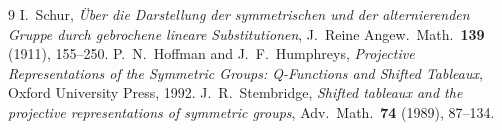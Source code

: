 \documentclass[11pt]{article}
\theoremstyle{remark}
\begin{document}
\begin{thebibliography}{9}
 I.~Schur, \emph{\"Uber die Darstellung der symmetrischen und der alternierenden
Gruppe durch gebrochene lineare Substitutionen}, J.~Reine Angew.\ Math.\ \textbf{139} (1911),
155--250.
 P.~N.~Hoffman and J.~F.~Humphreys, \emph{Projective Representations of the Symmetric
Groups: Q-Functions and Shifted Tableaux}, Oxford University Press, 1992.
 J.~R.~Stembridge, \emph{Shifted tableaux and the projective representations
of symmetric groups}, Adv.\ Math.\ \textbf{74} (1989), 87--134.
\end{thebibliography}
\end{document}
